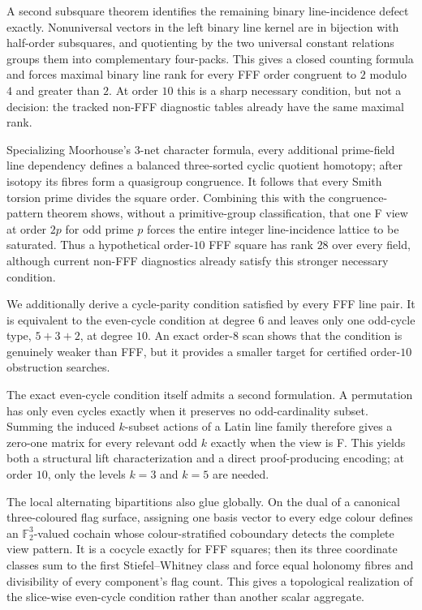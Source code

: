 A second subsquare theorem identifies the remaining binary line-incidence
defect exactly.  Nonuniversal vectors in the left binary line kernel are in
bijection with half-order subsquares, and quotienting by the two universal
constant relations groups them into complementary four-packs.  This gives a
closed counting formula and forces maximal binary line rank for every FFF
order congruent to $2$ modulo $4$ and greater than $2$.  At order $10$ this
is a sharp necessary condition, but not a decision: the tracked non-FFF
diagnostic tables already have the same maximal rank.

Specializing Moorhouse's $3$-net character formula, every additional
prime-field line dependency
defines a balanced three-sorted cyclic quotient homotopy; after isotopy its
fibres form a quasigroup congruence.  It follows that every Smith torsion
prime divides the square order.  Combining this with the congruence-pattern
theorem shows, without a primitive-group classification, that one F view at
order $2p$ for odd prime $p$ forces the entire integer line-incidence lattice
to be saturated.  Thus a hypothetical order-$10$ FFF square has rank $28$
over every field, although current non-FFF diagnostics already satisfy this
stronger necessary condition.

We additionally derive a cycle-parity condition satisfied by every FFF line
pair.  It is equivalent to the even-cycle condition at degree $6$ and leaves
only one odd-cycle type, $5+3+2$, at degree $10$.  An exact order-$8$ scan
shows that the condition is genuinely weaker than FFF, but it provides a
smaller target for certified order-$10$ obstruction searches.

The exact even-cycle condition itself admits a second formulation.  A
permutation has only even cycles exactly when it preserves no odd-cardinality
subset.  Summing the induced $k$-subset actions of a Latin line family
therefore gives a zero-one matrix for every relevant odd $k$ exactly when the
view is F.  This yields both a structural lift characterization and a direct
proof-producing encoding; at order $10$, only the levels $k=3$ and $k=5$ are
needed.

The local alternating bipartitions also glue globally.  On the dual of a
canonical three-coloured flag surface, assigning one basis vector to every
edge colour defines an $\mathbb F_2^3$-valued cochain whose colour-stratified
coboundary detects the complete view pattern.  It is a cocycle exactly for FFF
squares; then its three coordinate classes sum to the first
Stiefel--Whitney class and force equal holonomy fibres and divisibility of
every component's flag count.  This gives a topological realization of
the slice-wise even-cycle condition rather than another scalar aggregate.

